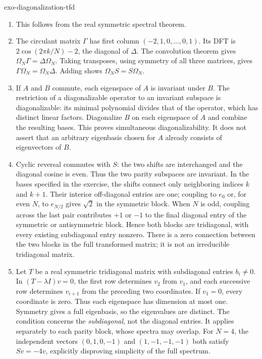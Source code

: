 \begin{correction}{exo-diagonalization-tfd}
\begin{enumerate}
\item This follows from the real symmetric spectral theorem.
\item The circulant matrix $\Gamma$ has first column
$(-2,1,0,\ldots,0,1)$. Its DFT is
$2\cos(2\pi k/N)-2$, the diagonal of $\Delta$.
The convolution theorem gives $\Omega_N\Gamma=\Delta\Omega_N$.
Taking transposes, using symmetry of all three matrices, gives
$\Gamma\Omega_N=\Omega_N\Delta$.
Adding shows $\Omega_NS=S\Omega_N$.
\item If $A$ and $B$ commute, each eigenspace of $A$ is invariant under $B$.
The restriction of a diagonalizable operator to an invariant subspace is
diagonalizable: its minimal polynomial divides that of the operator, which
has distinct linear factors. Diagonalize $B$ on each eigenspace of $A$ and
combine the resulting bases. This proves simultaneous diagonalizability.
It does not assert that an arbitrary eigenbasis chosen for $A$ already
consists of eigenvectors of $B$.
\item Cyclic reversal commutes with $S$: the two shifts are interchanged
and the diagonal cosine is even. Thus the two parity subspaces are invariant.
In the bases specified in the exercise, the shifts connect only neighboring
indices $k$ and $k+1$. Their interior off-diagonal entries are one; coupling
to $e_0$ or, for even $N$, to $e_{N/2}$ gives $\sqrt2$ in the symmetric
block. When $N$ is odd, coupling across the last pair contributes $+1$ or
$-1$ to the final diagonal entry of the symmetric or antisymmetric block.
Hence both blocks are tridiagonal, with every existing subdiagonal entry
nonzero. There is a zero connection between the two blocks in the full
transformed matrix; it is not an irreducible tridiagonal matrix.
\item Let $T$ be a real symmetric tridiagonal matrix with subdiagonal
entries $b_i\neq0$. In $(T-\lambda I)v=0$, the first row determines $v_2$
from $v_1$, and each successive row determines $v_{i+1}$ from the preceding
two coordinates. If $v_1=0$, every coordinate is zero.
Thus each eigenspace has dimension at most one. Symmetry gives a full
eigenbasis, so the eigenvalues are distinct. The condition concerns the
\emph{subdiagonal}, not the diagonal entries.
It applies separately to each parity block, whose spectra may overlap.
For $N=4$, the independent vectors $(0,1,0,-1)$ and $(1,-1,-1,-1)$ both
satisfy $Sv=-4v$, explicitly disproving simplicity of the full spectrum.

\end{enumerate}
\end{correction}
